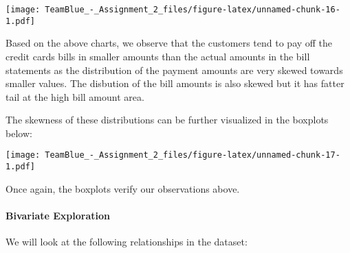 \documentclass[]{article}
\newenvironment{Shaded}{\begin{snugshade}}{\end{snugshade}}
\newcommand{\KeywordTok}[1]{\textcolor[rgb]{0.13,0.29,0.53}{\textbf{#1}}}
\newcommand{\DataTypeTok}[1]{\textcolor[rgb]{0.13,0.29,0.53}{#1}}
\newcommand{\DecValTok}[1]{\textcolor[rgb]{0.00,0.00,0.81}{#1}}
\newcommand{\StringTok}[1]{\textcolor[rgb]{0.31,0.60,0.02}{#1}}
\newcommand{\OperatorTok}[1]{\textcolor[rgb]{0.81,0.36,0.00}{\textbf{#1}}}
\newcommand{\NormalTok}[1]{#1}
\let\oldparagraph\paragraph
\renewcommand{\paragraph}[1]{\oldparagraph{#1}\mbox{}}
\begin{document}
\texttt{[image: TeamBlue\_-\_Assignment\_2\_files/figure-latex/unnamed-chunk-16-1.pdf]}

Based on the above charts, we observe that the customers tend to pay off
the credit cards bills in smaller amounts than the actual amounts in the
bill statements as the distribution of the payment amounts are very
skewed towards smaller values. The disbution of the bill amounts is also
skewed but it has fatter tail at the high bill amount area.

The skewness of these distributions can be further visualized in the
boxplots below:

\begin{Shaded}
\end{Shaded}

\texttt{[image: TeamBlue\_-\_Assignment\_2\_files/figure-latex/unnamed-chunk-17-1.pdf]}

Once again, the boxplots verify our observations above.

\paragraph{Bivariate Exploration}\label{bivariate-exploration}

We will look at the following relationships in the dataset:
\end{document}
